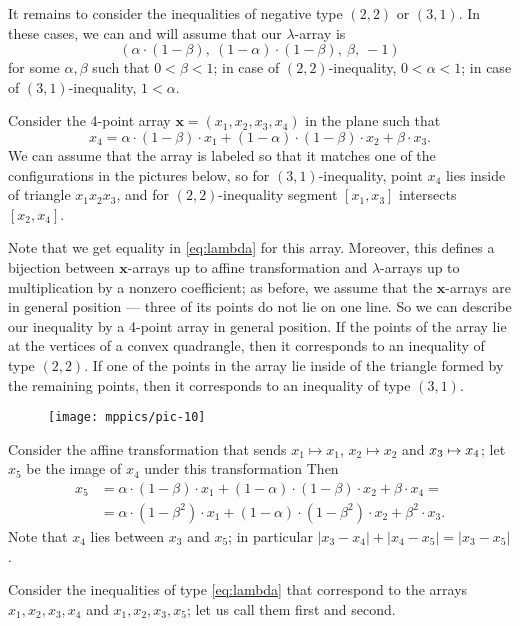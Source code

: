 \documentclass[a4paper,10pt]{article}
\begin{document}
It remains to consider the inequalities of negative type $(2,2)$ or $(3,1)$.
In these cases, we can and will assume that our $\lambda$-array is
\[(\alpha\cdot (1-\beta),\  (1-\alpha)\cdot(1-\beta),\  \beta,\ -1)\] 
for some $\alpha,\beta$ such that $0< \beta< 1$;
in case of $(2,2)$-inequality, $0<\alpha<1$;
in case of $(3,1)$-inequality, $1<\alpha$.

Consider the 4-point array $\bm{x}=(x_1,x_2,x_3,x_4)$  in the plane such that 
\[x_4=\alpha\cdot (1-\beta)\cdot x_1+(1-\alpha)\cdot(1-\beta)\cdot x_2+\beta\cdot x_3.\]
We can assume that the array is labeled so that it matches one of the configurations in the pictures below,
so for $(3,1)$-inequality, point $x_4$ lies inside of triangle $x_1x_2x_3$,
and for $(2,2)$-inequality segment $[x_1,x_3]$ intersects $[x_2,x_4]$.

Note that we get equality in \ref{eq:lambda} for this array.
Moreover, this defines a bijection between $\bm{x}$-arrays up to affine transformation and $\lambda$-arrays up to multiplication by a nonzero coefficient;
as before, we assume that the $\bm{x}$-arrays are in general position --- three of its points do not lie on one line.
So we can describe our inequality by a 4-point array in general position.
If the points of the array lie at the vertices of a convex quadrangle,
then it corresponds to an inequality of type $(2,2)$.
If one of the points in the array lie inside of the triangle formed by the remaining points, then it corresponds to an inequality of type $(3,1)$.

\begin{figure}[ht!]
\vskip-0mm
\centering
\texttt{[image: mppics/pic-10]}
\vskip0mm
\end{figure}

Consider the affine transformation that sends $x_1\mapsto x_1$, $x_2\mapsto x_2$ and $x_3\z\mapsto x_4$;
let $x_5$ be the image of $x_4$ under this transformation
Then
\begin{align*}
x_5&=\alpha\cdot (1-\beta)\cdot x_1+(1-\alpha)\cdot(1-\beta)\cdot x_2+\beta\cdot x_4=
\\
&=\alpha\cdot (1-\beta^2)\cdot x_1+(1-\alpha)\cdot(1-\beta^2)\cdot x_2+\beta^2\cdot x_3.
\end{align*}
Note that $x_4$ lies between $x_3$ and $x_5$;
in particular $|x_3-x_4|+|x_4-x_5|=|x_3-x_5|$.

Consider the inequalities of type \ref{eq:lambda} that correspond to the arrays $x_1,x_2,x_3,x_4$ and $x_1,x_2,x_3,x_5$;
let us call them first and second.
\end{document}
